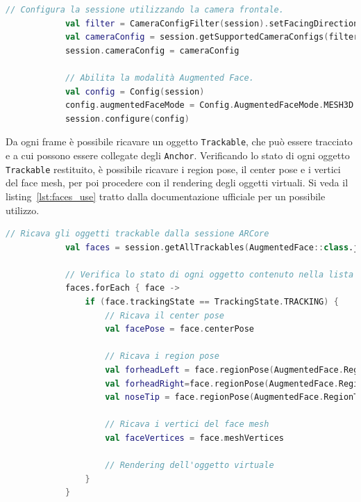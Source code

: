 \documentclass[crop=false, class=book]{standalone}
\begin{document}
	\begin{center}
		\begin{minipage}{0.95\textwidth}
			\begin{lstlisting}[caption={Configurazione della modalità Augmented Face.}, label={lst:af_session}, language=Kotlin]
			// Configura la sessione utilizzando la camera frontale.
			val filter = CameraConfigFilter(session).setFacingDirection(CameraConfig.FacingDirection.FRONT)
			val cameraConfig = session.getSupportedCameraConfigs(filter)[0]
			session.cameraConfig = cameraConfig
			
			// Abilita la modalità Augmented Face.
			val config = Config(session)
			config.augmentedFaceMode = Config.AugmentedFaceMode.MESH3D
			session.configure(config)
			\end{lstlisting}
		\end{minipage}
	\end{center}
	Da ogni frame è possibile ricavare un oggetto \verb|Trackable|, che può essere tracciato e a cui possono essere collegate degli \verb|Anchor|. Verificando lo stato di ogni oggetto \verb|Trackable| restituito, è possibile ricavare i region pose, il center pose e i vertici del face mesh, per poi procedere con il rendering degli oggetti virtuali. Si veda il listing~\vref{lst:faces_use} tratto dalla documentazione ufficiale per un possibile utilizzo.
	
	\begin{center}
		\begin{minipage}{0.95\textwidth}
			\begin{lstlisting}[caption={Utilizzo della modalità Augmented Faces.}, label={lst:faces_use}, language=Kotlin]
			// Ricava gli oggetti trackable dalla sessione ARCore
			val faces = session.getAllTrackables(AugmentedFace::class.java)
			
			// Verifica lo stato di ogni oggetto contenuto nella lista di Trackable
			faces.forEach { face ->
				if (face.trackingState == TrackingState.TRACKING) {
					// Ricava il center pose
					val facePose = face.centerPose
					
					// Ricava i region pose
					val forheadLeft = face.regionPose(AugmentedFace.RegionType.FOREHEAD_LEFT)
					val forheadRight=face.regionPose(AugmentedFace.RegionType.FOREHEAD_RIGHT)
					val noseTip = face.regionPose(AugmentedFace.RegionType.NOSE_TIP)
					
					// Ricava i vertici del face mesh
					val faceVertices = face.meshVertices
					
					// Rendering dell'oggetto virtuale
				}
			}
			\end{lstlisting}
		\end{minipage}
	\end{center}
	


	
	
\end{document}
